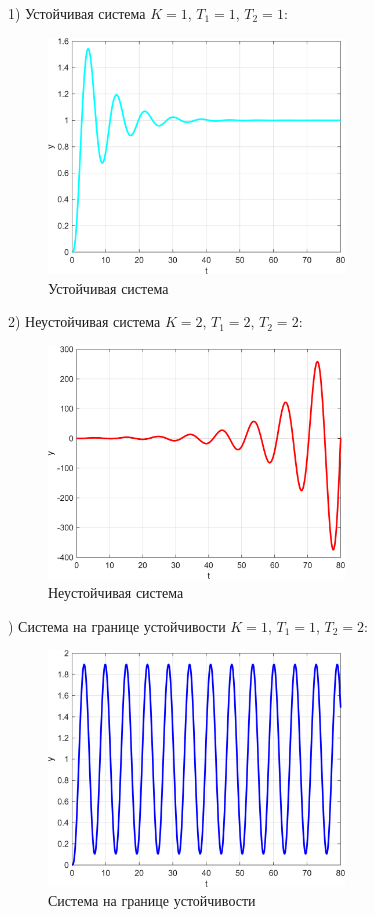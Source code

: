 1) Устойчивая система \(K = 1\), \(T_1 = 1\), \(T_2 = 1\):
\begin{figure}[ht]
    \centering
    \includegraphics[width=0.7\textwidth, trim={0cm 0cm 0cm 0cm}]{../images/2_3}
    \caption{Устойчивая система}
\end{figure}

2) Неустойчивая система \(K = 2\), \(T_1 = 2\), \(T_2 = 2\):
\begin{figure}[ht]
    \centering
    \includegraphics[width=0.7\textwidth, trim={0cm 0cm 0cm 0cm}]{../images/2_4}
    \caption{Неустойчивая система}
\end{figure}
) Система на границе устойчивости \(K = 1\), \(T_1 = 1\), \(T_2 = 2\):
\begin{figure}[ht]
    \centering
    \includegraphics[width=0.7\textwidth, trim={0cm 0cm 0cm 0cm}]{../images/2_5}
    \caption{Система на границе устойчивости}
\end{figure}
\endinput